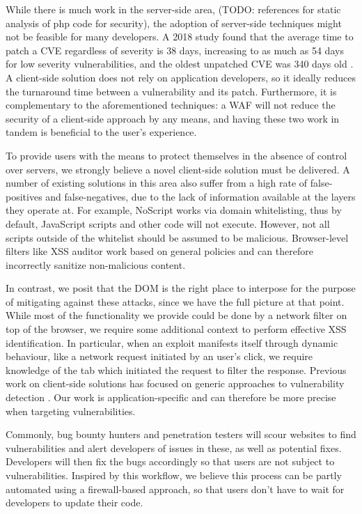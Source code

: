 While there is much work in the server-side area,
\cite{Xu:2006:TPE:1267336.1267345,DBLP:conf/sec/Nguyen-TuongGGSE05,Pietraszek:2005:DAI:2146257.2146267,Bisht:2008:XPD:1428322.1428325}
(TODO: references for static analysis of php code for security), the
adoption of server-side techniques might not be feasible for many
developers. A 2018 study found that the average time to patch a CVE
regardless of severity is 38 days, increasing to as much as 54 days
for low severity vulnerabilities, and the oldest unpatched CVE was 340
days old \cite{Rapid7}. A client-side solution does not rely on
application developers, so it ideally reduces the turnaround time
between a vulnerability and its patch. Furthermore, it is
complementary to the aforementioned techniques: a WAF will not reduce
the security of a client-side approach by any means, and having these
two work in tandem is beneficial to the user's experience.

To provide users with the means to protect themselves in the absence
of control over servers, we strongly believe a novel client-side
solution must be delivered. A number of existing solutions in this
area also suffer from a high rate of false-positives and
false-negatives, due to the lack of information available at the
layers they operate at. For example, NoScript works via domain
whitelisting, thus by default, JavaScript scripts and other code will
not execute. However, not all scripts outside of the whitelist should
be assumed to be malicious. Browser-level filters like XSS auditor
work based on general policies and can therefore incorrectly sanitize
non-malicious content.

In contrast, we posit that the DOM is the right place to interpose for
the purpose of mitigating against these attacks, since we have the
full picture at that point. While most of the functionality we provide
could be done by a network filter on top of the browser, we require
some additional context to perform effective XSS identification. In
particular, when an exploit manifests itself through dynamic
behaviour, like a network request initiated by an user's click, we
require knowledge of the tab which initiated the request to filter the
response. Previous work on client-side solutions has focused on
generic approaches to vulnerability detection
\cite{Kirda:2009:CCS:2639535.2639808,Jim:2007:DSI:1242572.1242654,Hallaraker:2005:DMJ:1078029.1078861}. Our
work is application-specific and can therefore be more precise when
targeting vulnerabilities.

Commonly, bug bounty hunters and penetration testers will scour
websites to find vulnerabilities and alert developers of issues in
these, as well as potential fixes. Developers will then fix the bugs
accordingly so that users are not subject to vulnerabilities. Inspired
by this workflow, we believe this process can be partly automated
using a firewall-based approach, so that users don't have to wait for
developers to update their code.

